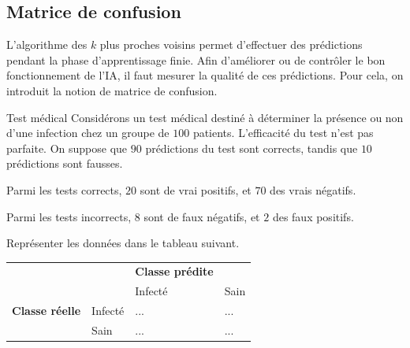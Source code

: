 \documentclass[12pt,fancy]{cours}
\begin{document}


\subsection{Matrice de confusion}
\label{sec:test}

L’algorithme des $k$ plus proches voisins permet d’effectuer des prédictions pendant la phase d'apprentissage finie. Afin d'améliorer ou de contrôler le bon fonctionnement de l'IA, il faut mesurer la qualité de ces prédictions. Pour cela, on introduit la notion de matrice de confusion.

\begin{exemple}{Test médical}
Considérons un test médical destiné à déterminer la présence ou non d’une infection chez un groupe de $100$ patients.
L’efficacité du test n’est pas parfaite. On suppose que $90$ prédictions du test sont corrects, tandis que $10$ prédictions sont fausses.
\begin{liste}
    \item Parmi les tests corrects,  $20$ sont de vrai positifs, et $70$ des vrais négatifs.
    \item Parmi les tests incorrects, $8$ sont de faux négatifs, et $2$ des faux positifs.
\end{liste}
Représenter les données dans le tableau suivant.

\begin{center}
\begin{tabular}{llll}
& & \textbf{Classe prédite} & \\
& & Infecté & Sain \\
\textbf{Classe réelle} & Infecté & ... & ...\\
 & Sain & ... & ... \\
\end{tabular}
\end{center}
\end{exemple}
\end{document}
